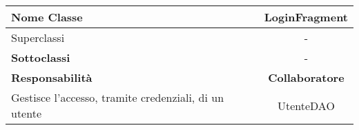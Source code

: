 
\setcounter{table}{0}
\begin{table}[H]
    \centering
    \begin{tabular}{||   l  ||  c   ||}
        \hline
        \rowcolor{Gray}
        \textbf{Nome Classe} & LoginFragment\\
        \hline
        Superclassi  &  - \\
        \hline
        \textbf{Sottoclassi} & - \\
        \hline
        \hline
         \textbf{Responsabilità} & \textbf{Collaboratore} \\
         \hline
           Gestisce l'accesso, tramite credenziali, di un utente & UtenteDAO \\
         \hline
    \end{tabular}
\end{table}
